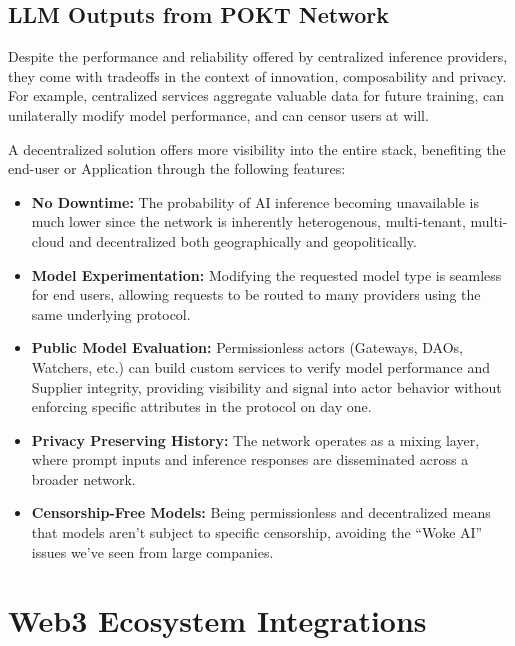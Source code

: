\documentclass[conference,compsoc]{IEEEtran}
\begin{document}
\subsection{LLM Outputs from POKT Network}

Despite the performance and reliability offered by centralized inference providers, they come with tradeoffs in the context of innovation, composability and privacy. For example, centralized services aggregate valuable data for future training, can unilaterally modify model performance, and can censor users at will.

A decentralized solution offers more visibility into the entire stack, benefiting the end-user or Application through the following features:

\begin{itemize}
    \item \textbf{No Downtime:} The probability of AI inference becoming unavailable is much lower since the network is inherently heterogenous, multi-tenant, multi-cloud and decentralized both geographically and geopolitically.

    \item \textbf{Model Experimentation: } Modifying the requested model type is seamless for end users, allowing requests to be routed to many providers using the same underlying protocol.

    \item \textbf{Public Model Evaluation:} Permissionless actors (Gateways, DAOs, Watchers, etc.) can build custom services to verify model performance and Supplier integrity, providing visibility and signal into actor behavior without enforcing specific attributes in the protocol on day one.

    \item \textbf{Privacy Preserving History:} The network operates as a mixing layer, where prompt inputs and inference responses are disseminated across a broader network.

    \item \textbf{Censorship-Free Models:}  Being permissionless and decentralized means that models aren’t subject to specific censorship, avoiding the “Woke AI”~\cite{thefpGooglesWoke} issues we’ve seen from large companies.
\end{itemize}

\section{Web3 Ecosystem Integrations}
\end{document}
